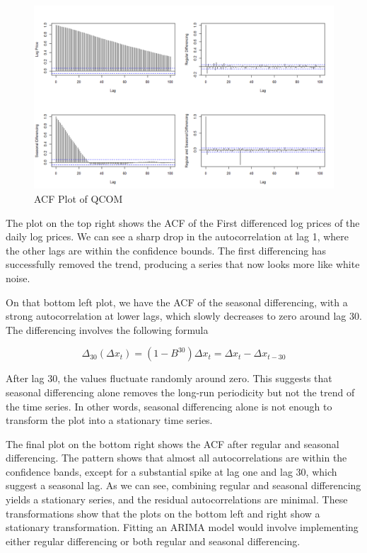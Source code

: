 \documentclass[12pt]{article}
\begin{document}
\begin{figure}[h]
	\centering
	\includegraphics[width=1\linewidth]{plots/acf_plot_time_series.png}
	\caption{ACF Plot of QCOM }
	\label{fig:qcom_acf_plots}
\end{figure}

The plot on the top right shows the ACF of the First differenced log prices of the daily log prices. We can see a sharp drop in the autocorrelation at lag 1, where the other lags are within the confidence bounds. The first differencing has successfully removed the trend, producing a series that now looks more like white noise. 

On that bottom left plot, we have the ACF of the seasonal differencing, with a strong autocorrelation at lower lags, which slowly decreases to zero around lag 30. The differencing involves the following formula

\begin{equation}
	\Delta_{30}(\Delta x_t)=(1-B^{30})\Delta x_t=\Delta x_t-\Delta x_{t-30}
\end{equation}

After lag 30, the values fluctuate randomly around zero. This suggests that seasonal differencing alone removes the long-run periodicity but not the trend of the time series. In other words, seasonal differencing alone is not enough to transform the plot into a stationary time series.

The final plot on the bottom right shows the ACF after regular and seasonal differencing. The pattern shows that almost all autocorrelations are within the confidence bands, except for a substantial spike at lag one and lag 30, which suggest a seasonal lag. As we can see, combining regular and seasonal differencing yields a stationary series, and the residual autocorrelations are minimal. These transformations show that the plots on the bottom left and right show a stationary transformation. Fitting an ARIMA model would involve implementing either regular differencing or both regular and seasonal differencing.
\end{document}

